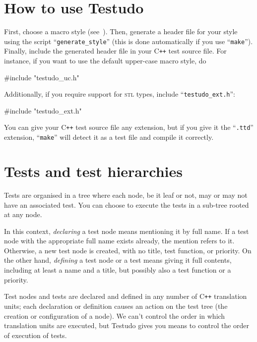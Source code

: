 \documentclass[twoside, a4paper, article]{memoir}
\newcommand*\Cpp{C\texttt{++}}
\begin{document}
\chapter{How to use Testudo}
\label{cha:how-to-use}

First, choose a macro style
(see~).  Then, generate a
header file for your style using the script ``\texttt{generate\_style}'' (this
is done automatically if you use ``\texttt{make}'').  Finally, include the
generated header file in your \Cpp{} test source file.  For instance, if you
want to use the default upper-case macro style, do
\begin{cpplisting}
#include "testudo_uc.h"
\end{cpplisting}

Additionally, if you require support for \textsc{stl} types, include
``\texttt{testudo\_ext.h}'':
\begin{cpplisting}
#include "testudo_ext.h"
\end{cpplisting}

You can give your \Cpp{} test source file any extension, but if you give it the
``\texttt{.ttd}'' extension, ``\texttt{make}'' will detect it as a test file
and compile it correctly.


\chapter{Tests and test hierarchies}
\label{cha:tests-test-hierarchies}

Tests are organised in a tree where each node, be it leaf or not, may or may
not have an associated test.  You can choose to execute the tests in a sub-tree
rooted at any node.

In this context, \emph{declaring} a test node means mentioning it by full name.
If a test node with the appropriate full name exists already, the mention
refers to it.  Otherwise, a new test node is created, with no title, test
function, or priority.  On the other hand, \emph{defining} a test node or a
test means giving it full contents, including at least a name and a title, but
possibly also a test function or a priority.

Test nodes and tests are declared and defined in any number of \Cpp{}
translation units; each declaration or definition causes an action on the test
tree (the creation or configuration of a node).  We can't control the order in
which translation units are executed, but Testudo gives you means to control
the order of execution of tests.
\end{document}
